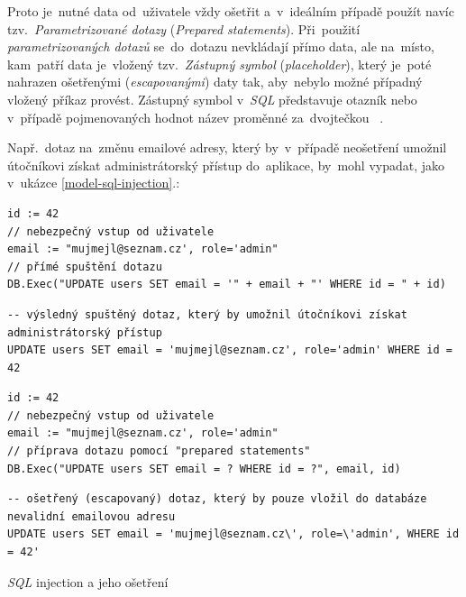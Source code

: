 \documentclass[11pt,a4paper]{report}
\let\oldacrshort\acrshort
\renewcommand{\acrshort}[1]{\emph{\normalsize\color[rgb]{0,0,0}\noindent\oldacrshort{#1}}}
\begin{document}
                Proto je~nutné data od~uživatele vždy ošetřit a~v~ideálním případě použít navíc tzv.~\emph{Parametrizované dotazy} (\emph{Prepared statements}). Při~použití \emph{parametrizovaných dotazů} se~do~dotazu nevkládají přímo data, ale na~místo, kam~patří data je~vložený tzv.~\emph{Zástupný symbol} (\emph{placeholder}), který je~poté nahrazen ošetřenými (\emph{escapovanými}) daty tak, aby~nebylo možné případný vložený příkaz provést. Zástupný symbol v~\acrshort{SQL} představuje otazník  nebo v~případě pojmenovaných hodnot název proměnné za~dvojtečkou ~\cite{graham2021ethical}.
                
                Např.~dotaz na~změnu emailové adresy, který by~v~případě neošetření umožnil útočníkovi získat administrátorský přístup do~aplikace, by~mohl vypadat, jako v~ukázce \ref{model-sql-injection}.:
                \begin{code}
                    \centering
                    \begin{minipage}{0.48\textwidth}
                        \begin{verbatim}
id := 42
// nebezpečný vstup od uživatele
email := "mujmejl@seznam.cz', role='admin"
// přímé spuštění dotazu
DB.Exec("UPDATE users SET email = '" + email + "' WHERE id = " + id)
                        \end{verbatim}
                        \begin{verbatim}
-- výsledný spuštěný dotaz, který by umožnil útočníkovi získat administrátorský přístup
UPDATE users SET email = 'mujmejl@seznam.cz', role='admin' WHERE id = 42
                        \end{verbatim}
                        \subcaption{Neošetřený řetězec vložený do \acrshort{SQL}}
                    \end{minipage}
                    \begin{minipage}{0.48\textwidth}
                        \begin{verbatim}
id := 42
// nebezpečný vstup od uživatele
email := "mujmejl@seznam.cz', role='admin"
// příprava dotazu pomocí "prepared statements"
DB.Exec("UPDATE users SET email = ? WHERE id = ?", email, id)
                        \end{verbatim}
                        \begin{verbatim}
-- ošetřený (escapovaný) dotaz, který by pouze vložil do databáze nevalidní emailovou adresu
UPDATE users SET email = 'mujmejl@seznam.cz\', role=\'admin', WHERE id = 42'
                        \end{verbatim}
                    \end{minipage}
                    \caption{\acrshort{SQL} injection a jeho ošetření}
                    \label{model-sql-injection}
                \end{code}
\end{document}
